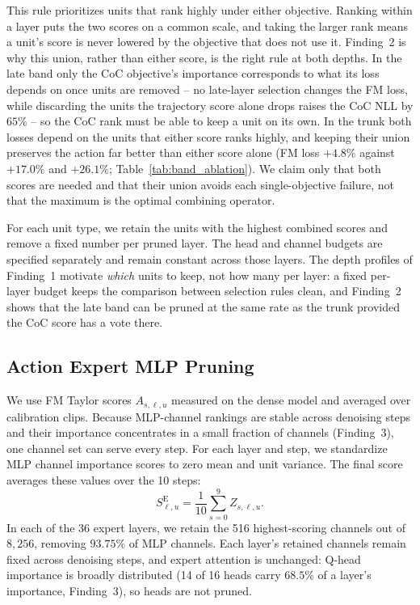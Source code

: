 This rule prioritizes units that rank highly under either objective. Ranking within a layer puts the two scores on a common scale, and taking the larger rank means a unit's score is never lowered by the objective that does not use it. Finding~2 is why this union, rather than either score, is the right rule at both depths. In the late band only the CoC objective's importance corresponds to what its loss depends on once units are removed -- no late-layer selection changes the FM loss, while discarding the units the trajectory score alone drops raises the CoC NLL by $65\%$ -- so the CoC rank must be able to keep a unit on its own. In the trunk both losses depend on the units that either score ranks highly, and keeping their union preserves the action far better than either score alone (FM loss $+4.8\%$ against $+17.0\%$ and $+26.1\%$; Table~\ref{tab:band_ablation}). We claim only that both scores are needed and that their union avoids each single-objective failure, not that the maximum is the optimal combining operator.

For each unit type, we retain the units with the highest combined scores and remove a fixed number per pruned layer. The head and channel budgets are specified separately and remain constant across those layers. The depth profiles of Finding~1 motivate \emph{which} units to keep, not how many per layer: a fixed per-layer budget keeps the comparison between selection rules clean, and Finding~2 shows that the late band can be pruned at the same rate as the trunk provided the CoC score has a vote there.

\subsection{Action Expert MLP Pruning}
\label{sec:expert_pruning}

We use FM Taylor scores $A_{s,\ell,u}$ measured on the dense model
and averaged over calibration clips. Because MLP-channel rankings are stable across denoising steps and their importance concentrates in a small fraction of channels (Finding~3), one channel set can serve every step. For each layer and step,
we standardize MLP channel importance scores to zero mean and unit variance. The final score averages these values over the 10 steps:
\begin{equation}
    S^{\mathrm E}_{\ell,u}
      = \frac{1}{10}\sum_{s=0}^{9}Z_{s,\ell,u}.
    \label{eq:expert_pruning_score}
\end{equation}
In each of the 36 expert layers, we retain the 516 highest-scoring
channels out of $8{,}256$, removing $93.75\%$ of MLP channels.
Each layer's retained channels remain fixed across denoising steps,
and expert attention is unchanged: Q-head importance is broadly distributed (14 of 16 heads carry $68.5\%$ of a layer's importance, Finding~3), so heads are not pruned.

